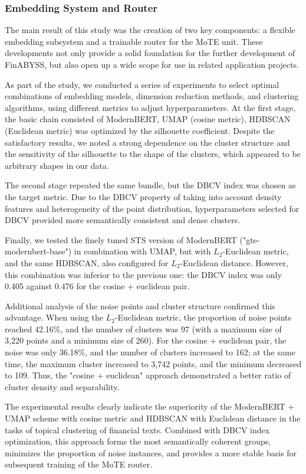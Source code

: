 \subsubsection{Embedding System and Router}
\label{sec:emb_sys_and_router}
The main result of this study was the creation of two key components: a flexible embedding
subsystem and a trainable router for the MoTE unit. These developments not only provide
a solid foundation for the further development of FinABYSS, but also open up a wide scope
for use in related application projects.

As part of the study, we conducted a series of experiments to select optimal combinations
of embedding models, dimension reduction methods, and clustering algorithms, using different
metrics to adjust hyperparameters. At the first stage, the basic chain consisted of ModernBERT,
UMAP (cosine metric), HDBSCAN (Euclidean metric) was optimized by the silhouette coefficient.
Despite the satisfactory results, we noted a strong dependence on the cluster structure and
the sensitivity of the silhouette to the shape of the clusters, which appeared to be arbitrary
shapes in our data.

The second stage repeated the same bundle, but the DBCV index was chosen as the target metric. Due
to the DBCV property of taking into account density features and heterogeneity of the point
distribution, hyperparameters selected for DBCV provided more semantically consistent and dense
clusters.

Finally, we tested the finely tuned STS version of ModernBERT ("gte-modernbert-base")
\parencite{MGTE2024} in combination with UMAP, but with $L_2$-Euclidean
metric, and the same HDBSCAN, also configured for $L_2$-Euclidean distance. However, this
combination was inferior to the previous one: the DBCV index was only 0.405 against 0.476
for the cosine + euclidean pair.

Additional analysis of the noise points and cluster structure confirmed this advantage. When using
the $L_2$-Euclidean metric, the proportion of noise points reached 42.16\%, and the number
of clusters was 97 (with a maximum size of 3,220 points and a minimum size of 260).
For the cosine + euclidean pair, the noise was only 36.18\%, and the number of clusters increased
to 162; at the same time, the maximum cluster increased to 3,742 points, and the minimum decreased
to 109. Thus, the "cosine + euclidean" approach demonstrated a better ratio of cluster density
and separability.

The experimental results clearly indicate the superiority of the ModernBERT + UMAP scheme with cosine
metric and HDBSCAN with Euclidean distance in the tasks of topical clustering of financial texts.
Combined with DBCV index optimization, this approach forms the most semantically coherent groups,
minimizes the proportion of noise instances, and provides a more stable basis for subsequent training
of the MoTE router.


